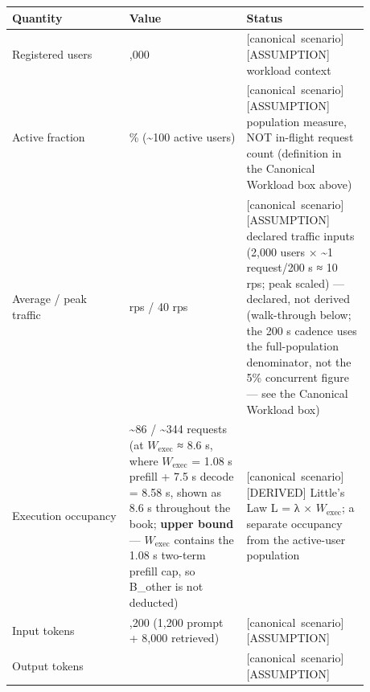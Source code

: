 \nopagebreak[4]
\begin{longtable}[]{@{}
  >{\raggedright\arraybackslash}p{0.2927\linewidth}
  >{\raggedright\arraybackslash}p{0.2927\linewidth}
  >{\raggedright\arraybackslash}p{0.2927\linewidth}@{}}
\toprule\noalign{}
\begin{minipage}[b]{\linewidth}\raggedright
Quantity
\end{minipage} & \begin{minipage}[b]{\linewidth}\raggedright
Value
\end{minipage} & \begin{minipage}[b]{\linewidth}\raggedright
Status
\end{minipage} \\
\midrule\noalign{}
\endhead
\bottomrule\noalign{}
\endlastfoot
Registered users & 2,000 & \mbox{{[}canonical scenario{]}}\hspace{0pt}\mbox{{[}ASSUMPTION{]}}
workload context \\
\noalign{\label{tab:4.2}}
Active fraction & 5\% (\textasciitilde100 active users) & \mbox{{[}canonical
scenario{]}}\hspace{0pt}\mbox{{[}ASSUMPTION{]}} population measure, NOT in-flight request
count (definition in the Canonical Workload box above) \\
Average / peak traffic & 10 rps / 40 rps & \mbox{{[}canonical
scenario{]}}\hspace{0pt}\mbox{{[}ASSUMPTION{]}} declared traffic inputs (2,000 users ×
\textasciitilde1 request/200 s ≈ 10 rps; peak scaled) --- declared, not
derived (walk-through below; the 200 s cadence uses the full-population
denominator, not the 5\% concurrent figure --- see the Canonical
Workload box) \\
Execution occupancy & \textasciitilde86 / \textasciitilde344 requests
(at \(W_{\mathrm{exec}}\) ≈ 8.6 s, where \(W_{\mathrm{exec}}\) = 1.08 s
prefill + 7.5 s decode = 8.58 s, shown as 8.6 s throughout the book;
\textbf{upper bound} --- \(W_{\mathrm{exec}}\) contains the 1.08 s
two-term prefill cap, so B\_other is not deducted) & \mbox{{[}canonical
scenario{]}}\hspace{0pt}\mbox{{[}DERIVED{]}} Little's Law L = λ × \(W_{\mathrm{exec}}\); a
separate occupancy from the active-user population \\
Input tokens & 9,200 (1,200 prompt + 8,000 retrieved) & \mbox{{[}canonical
scenario{]}}\hspace{0pt}\mbox{{[}ASSUMPTION{]}} \\
Output tokens & 300 & \mbox{{[}canonical scenario{]}}\hspace{0pt}\mbox{{[}ASSUMPTION{]}} \\

\end{longtable}
